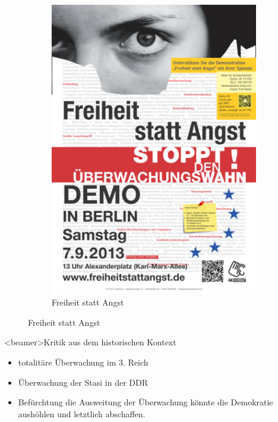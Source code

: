 \begin{frame}
\begin{figure}
\begin{subfigure}[b]{0.3\textwidth}
          \includegraphics[scale=0.05]{sections/img/freiheit_statt_angst.png}
          \caption{Freiheit statt Angst}
          \label{fig:tiger}
        \end{subfigure}
      \end{figure}
    \end{frame}

    \begin{frame}<beamer>{Kritik aus dem historischen Kontext}
       \begin{itemize}
        \item totalitäre Überwachung im 3. Reich
        \item Überwachung der Stasi in der DDR
        \item Befürchtung die Ausweitung der Überwachung könnte die Demokratie aushöhlen und letztlich abschaffen.
      \end{itemize}
    \end{frame}

